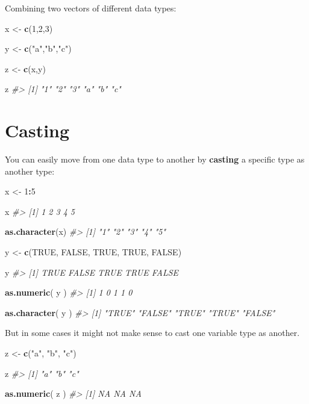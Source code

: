 \documentclass[]{book}
\newenvironment{Shaded}{\begin{snugshade}}{\end{snugshade}}
\newcommand{\CommentTok}[1]{\textcolor[rgb]{0.56,0.35,0.01}{\textit{#1}}}
\newcommand{\DecValTok}[1]{\textcolor[rgb]{0.00,0.00,0.81}{#1}}
\newcommand{\KeywordTok}[1]{\textcolor[rgb]{0.13,0.29,0.53}{\textbf{#1}}}
\newcommand{\NormalTok}[1]{#1}
\newcommand{\OperatorTok}[1]{\textcolor[rgb]{0.81,0.36,0.00}{\textbf{#1}}}
\newcommand{\OtherTok}[1]{\textcolor[rgb]{0.56,0.35,0.01}{#1}}
\newcommand{\StringTok}[1]{\textcolor[rgb]{0.31,0.60,0.02}{#1}}
\theoremstyle{definition}
\theoremstyle{definition}
\theoremstyle{definition}
\theoremstyle{remark}
\begin{document}
Combining two vectors of different data types:

\begin{Shaded}
\begin{Highlighting}[]
\NormalTok{x <-}\StringTok{ }\KeywordTok{c}\NormalTok{(}\DecValTok{1}\NormalTok{,}\DecValTok{2}\NormalTok{,}\DecValTok{3}\NormalTok{)}

\NormalTok{y <-}\StringTok{ }\KeywordTok{c}\NormalTok{(}\StringTok{"a"}\NormalTok{,}\StringTok{"b"}\NormalTok{,}\StringTok{"c"}\NormalTok{)}

\NormalTok{z <-}\StringTok{ }\KeywordTok{c}\NormalTok{(x,y)}

\NormalTok{z}
\CommentTok{#> [1] "1" "2" "3" "a" "b" "c"}
\end{Highlighting}
\end{Shaded}

\hypertarget{casting}{%
\section{Casting}\label{casting}}

You can easily move from one data type to another by \textbf{casting} a
specific type as another type:

\begin{Shaded}
\begin{Highlighting}[]

\NormalTok{x <-}\StringTok{ }\DecValTok{1}\OperatorTok{:}\DecValTok{5}

\NormalTok{x}
\CommentTok{#> [1] 1 2 3 4 5}

\KeywordTok{as.character}\NormalTok{(x)}
\CommentTok{#> [1] "1" "2" "3" "4" "5"}

\NormalTok{y <-}\StringTok{ }\KeywordTok{c}\NormalTok{(}\OtherTok{TRUE}\NormalTok{, }\OtherTok{FALSE}\NormalTok{, }\OtherTok{TRUE}\NormalTok{, }\OtherTok{TRUE}\NormalTok{, }\OtherTok{FALSE}\NormalTok{)}

\NormalTok{y}
\CommentTok{#> [1]  TRUE FALSE  TRUE  TRUE FALSE}

\KeywordTok{as.numeric}\NormalTok{( y )}
\CommentTok{#> [1] 1 0 1 1 0}

\KeywordTok{as.character}\NormalTok{( y )}
\CommentTok{#> [1] "TRUE"  "FALSE" "TRUE"  "TRUE"  "FALSE"}
\end{Highlighting}
\end{Shaded}

But in some cases it might not make sense to cast one variable type as
another.

\begin{Shaded}
\begin{Highlighting}[]

\NormalTok{z <-}\StringTok{ }\KeywordTok{c}\NormalTok{(}\StringTok{"a"}\NormalTok{, }\StringTok{"b"}\NormalTok{, }\StringTok{"c"}\NormalTok{)}

\NormalTok{z}
\CommentTok{#> [1] "a" "b" "c"}

\KeywordTok{as.numeric}\NormalTok{( z )}
\CommentTok{#> [1] NA NA NA}
\end{Highlighting}
\end{Shaded}
\end{document}
